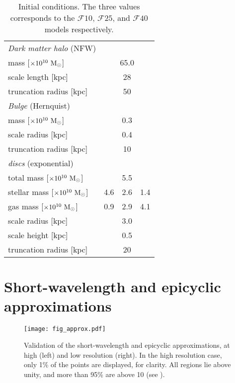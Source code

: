 \documentclass[useAMS,usenatbib]{mnras}
\newcommand{\gs}{\ensuremath{\mathcal{F}10}\xspace}
\newcommand{\gm}{\ensuremath{\mathcal{F}25}\xspace}
\newcommand{\gl}{\ensuremath{\mathcal{F}40}\xspace}
\begin{document}
\begin{table}
\centering
\caption{Initial conditions. The three values corresponds to the \gs, \gm, and \gl models respectively.}
\label{tab:ics}
\begin{tabular}{|l c c c|} 
\hline
\emph{Dark matter halo} (NFW) \\ 
mass [$\times 10^{10} \mathrm{~M}_{\odot}$] & \multicolumn{3}{c}{65.0} \\
scale length [kpc] & \multicolumn{3}{c}{28} \\
truncation radius [kpc] & \multicolumn{3}{c}{50}\\
\hline
\emph{Bulge} (Hernquist) \\
mass [$\times 10^{10} \mathrm{~M}_{\odot}$] & \multicolumn{3}{c}{0.3} \\
scale radius [kpc] & \multicolumn{3}{c}{0.4} \\
truncation radius [kpc] & \multicolumn{3}{c}{10}\\ 
\hline
\emph{discs} (exponential) \\
total mass [$\times 10^{10} \mathrm{~M}_{\odot}$] &  \multicolumn{3}{c}{5.5} \\
stellar mass [$\times 10^{10} \mathrm{~M}_{\odot}$] & 4.6 & 2.6 & 1.4 \\
gas mass [$\times 10^{10} \mathrm{~M}_{\odot}$] & 0.9 & 2.9 & 4.1 \\
scale radius [kpc] & \multicolumn{3}{c}{3.0} \\
scale height [kpc] & \multicolumn{3}{c}{0.5} \\
truncation radius [kpc] & \multicolumn{3}{c}{20}\\
\hline
\end{tabular}
\end{table}

\section{Short-wavelength and epicyclic approximations}
\label{sec:approx}

\begin{figure}
\centering
\texttt{[image: fig\_approx.pdf]}
\caption{Validation of the short-wavelength and epicyclic approximations, at high (left) and low resolution (right). In the high resolution case, only 1\% of the points are displayed, for clarity. All regions lie above unity, and more than 95\% are above 10 (see ).}
\label{fig:approx}
\end{figure}
\end{document}
